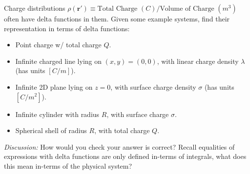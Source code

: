 \documentclass[12pt,fleqn]{article}
\numberwithin{equation}{section} %
\newcounter{problem}
\begin{document}
\begin{problem}
	Charge distributions $\rho(\mathbf r') \equiv \text{Total Charge } (C) / \text{Volume of Charge } (m^3)$ often have delta functions in them. Given some example systems, find their representation in terms of delta functions: 
	\begin{itemize}
		\item Point charge w/ total charge $Q$.
		\item Infinite charged line lying on $(x,y) = (0,0)$, with linear charge density $\lambda$ (has units $[C/m]$).
		\item Infinite 2D plane lying on $z=0$, with surface charge density $\sigma$ (has units $[C/m^2]$).
		\item Infinite cylinder with radius $R$, with surface charge $\sigma$.
		\item Spherical shell of radius $R$, with total charge $Q$. 
	\end{itemize}
	\emph{Discussion:} How would you check your answer is correct? Recall equalities of expressions with delta functions are only defined in-terms of integrals, what does this mean in-terms of the physical system?
\end{problem}
\end{document}
